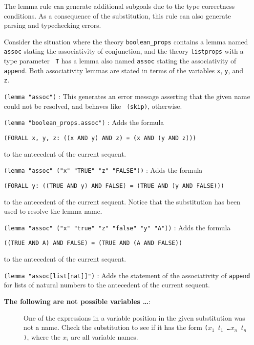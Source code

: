 \documentclass[12pt,twoside]{book}
\newenvironment{usage}[1]{\item[usage:\hspace*{-0.175in}]#1\begin{description}\setlength{\itemindent}{-0.2in}\setlength{\itemsep}{0.1in}}{\end{description}}
\begin{document}
\begin{description}
The lemma rule can generate additional subgoals due to the type
correctness conditions.  As a consequence of the substitution,
this rule can also generate parsing and typechecking errors.

\begin{usage}
{\hspace*{0.2in}Consider the situation where the theory \texttt{boolean\_props}
contains a lemma named \texttt{assoc} stating the associativity of
conjunction, and the theory \texttt{listprops} with a type parameter {\tt
T} has a lemma also named \texttt{assoc} stating the associativity of {\tt
append}.  Both associativity lemmas are stated in terms of the variables
\texttt{x}, \texttt{y}, and \texttt{z}.}

\item[\texttt{(lemma "assoc")}] : This generates an error message asserting
that the given name could not be resolved, and behaves like {\tt
(skip)}, otherwise.

\item[\texttt{(lemma "boolean\_props.assoc")}] : Adds the formula
\begin{center}
\texttt{(FORALL x, y, z:\ ((x AND y) AND z) = (x AND (y AND z)))}
\end{center}
to the antecedent of the current sequent.

\item[\texttt{(lemma "assoc" ("x" "TRUE" "z" "FALSE"))}] : Adds the
formula
\begin{center}
\texttt{(FORALL  y:\ ((TRUE AND y) AND FALSE) = (TRUE AND (y AND FALSE)))}
\end{center}
to the ante\-ce\-dent of the current sequent.  Notice that the
substitution has been used to resolve the lemma name.

\item[\texttt{(lemma "assoc" ("x" "true" "z" "false" "y" "A"))}] : Adds the
formula
\begin{center}
\texttt{((TRUE AND A) AND FALSE) = (TRUE AND (A AND FALSE))}
\end{center}
to the antecedent of the current sequent.

\item[\texttt{(lemma "assoc[list[nat]]")}] : Adds the statement of the
associativity of \texttt{append} for lists of natural numbers to the
antecedent of the current sequent.
\end{usage}

\item[errors:]
\begin{description}
\item[{\bf The following are not possible variables \ldots}:]  One of the
expressions in a variable position in the given substitution was not a
name.  Check the substitution to see if it has the form \texttt{($x_1$
$t_1$ \ldots $x_n$ $t_n$)}, where the $x_i$ are all variable names.


\end{description}
\end{description}
\end{document}
